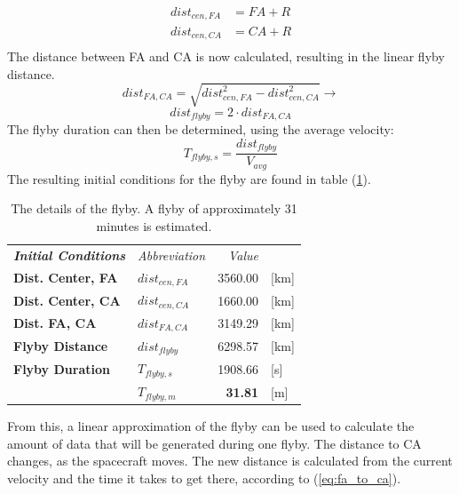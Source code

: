 \begin{equation}\label{eq:dist_centers}
\begin{split}
dist_{cen,FA} &= FA+R\\
dist_{cen,CA} &= CA+R\\
\end{split}
\end{equation}
The distance between FA and CA is now calculated, resulting in the linear flyby distance.
\begin{equation}\label{eq:dist_fa_ca}
dist_{FA, CA} = \sqrt{dist_{cen,FA}^2-dist_{cen,CA}^2} \rightarrow
\end{equation}
\begin{equation}\label{eq:dist_flyby_dist}
dist_{flyby} = 2\cdot dist_{FA, CA}
\end{equation}
The flyby duration can then be determined, using the average velocity:
\begin{equation}
T_{flyby,s} = \frac{dist_{flyby}}{V_{avg}}
\end{equation}
The resulting initial conditions for the flyby are found in table (\ref{tab:flyby_init_cond}).
\begin{table}[htb]
  \centering
    \begin{tabular}{l|l|r|l}
\textit{\textbf{Initial Conditions}} & \textit{Abbreviation} & \multicolumn{1}{r}{\textit{Value}} &  \bigstrut[b]\\
\cline{1-3}\textbf{Dist. Center, FA} & $dist_{cen,FA}$ & 3560.00 & [km] \bigstrut[t]\\
\textbf{Dist. Center, CA} & $dist_{cen,CA}$ & 1660.00 & [km] \bigstrut[b]\\
\cline{1-3}\textbf{Dist. FA, CA} & $dist_{FA, CA}$ & 3149.29 & [km] \bigstrut[t]\\
\textbf{Flyby Distance} & $dist_{flyby}$ & 6298.57 & [km] \bigstrut[b]\\
\cline{1-3}\textbf{Flyby Duration} & $T_{flyby,s}$ & 1908.66 & [s] \bigstrut[t]\\
      & $T_{flyby,m}$ & \textbf{31.81} & [m] \\
\end{tabular}%
  \caption{The details of the flyby. A flyby of approximately 31 minutes is estimated.}
  \label{tab:flyby_init_cond}%
\end{table}%
From this, a linear approximation of the flyby can be used to calculate the amount of data that will be generated during one flyby. The distance to CA changes, as the spacecraft moves. The new distance is calculated from the current velocity and the time it takes to get there, according to (\ref{eq:fa_to_ca}).
